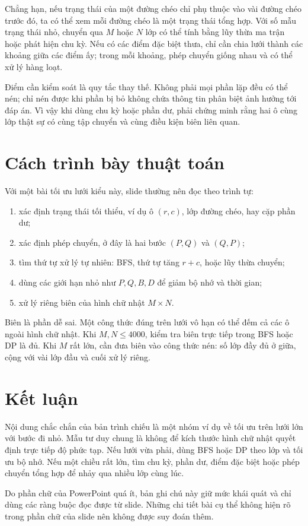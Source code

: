 \documentclass[11pt]{article}
\begin{document}
Chẳng hạn, nếu trạng thái của một đường chéo chỉ phụ thuộc vào vài đường chéo
trước đó, ta có thể xem mỗi đường chéo là một trạng thái tổng hợp. Với số mẫu
trạng thái nhỏ, chuyển qua \(M\) hoặc \(N\) lớp có thể tính bằng lũy thừa ma
trận hoặc phát hiện chu kỳ. Nếu có các điểm đặc biệt thưa, chỉ cần chia lưới
thành các khoảng giữa các điểm ấy; trong mỗi khoảng, phép chuyển giống nhau và
có thể xử lý hàng loạt.

Điểm cần kiểm soát là quy tắc thay thế. Không phải mọi phần lặp đều có thể
nén; chỉ nén được khi phần bị bỏ không chứa thông tin phân biệt ảnh hưởng tới
đáp án. Vì vậy khi dùng chu kỳ hoặc phần dư, phải chứng minh rằng hai ô cùng
lớp thật sự có cùng tập chuyển và cùng điều kiện biên liên quan.

\section{Cách trình bày thuật toán}

Với một bài tối ưu lưới kiểu này, slide thường nên đọc theo trình tự:
\begin{enumerate}
  \item xác định trạng thái tối thiểu, ví dụ ô \((r,c)\), lớp đường chéo, hay
  cặp phần dư;
  \item xác định phép chuyển, ở đây là hai bước \((P,Q)\) và \((Q,P)\);
  \item tìm thứ tự xử lý tự nhiên: BFS, thứ tự tăng \(r+c\), hoặc lũy thừa
  chuyển;
  \item dùng các giới hạn nhỏ như \(P,Q,B,D\) để giảm bộ nhớ và thời gian;
  \item xử lý riêng biên của hình chữ nhật \(M\times N\).
\end{enumerate}

Biên là phần dễ sai. Một công thức đúng trên lưới vô hạn có thể đếm cả các ô
ngoài hình chữ nhật. Khi \(M,N\le 4000\), kiểm tra biên trực tiếp trong BFS
hoặc DP là đủ. Khi \(M\) rất lớn, cần đưa biên vào công thức nén: số lớp đầy
đủ ở giữa, cộng với vài lớp đầu và cuối xử lý riêng.

\section{Kết luận}

Nội dung chắc chắn của bản trình chiếu là một nhóm ví dụ về tối ưu trên lưới
lớn với bước đi nhỏ. Mẫu tư duy chung là không để kích thước hình chữ nhật
quyết định trực tiếp độ phức tạp. Nếu lưới vừa phải, dùng BFS hoặc DP theo
lớp và tối ưu bộ nhớ. Nếu một chiều rất lớn, tìm chu kỳ, phần dư, điểm đặc
biệt hoặc phép chuyển tổng hợp để nhảy qua nhiều lớp cùng lúc.

Do phần chữ của PowerPoint quá ít, bản ghi chú này giữ mức khái quát và chỉ
dùng các ràng buộc đọc được từ slide. Những chi tiết bài cụ thể không hiện rõ
trong phần chữ của slide nên không được suy đoán thêm.
\end{document}
